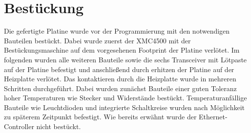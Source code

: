 \section{Bestückung}
Die gefertigte Platine wurde vor der Programmierung mit den notwendigen Bauteilen bestückt. Dabei wurde zuerst der XMC4500 mit der Bestückungsmaschine auf dem vorgesehenen Footprint der Platine verlötet. Im folgenden wurden alle weiteren Bauteile sowie die sechs Transceiver mit Lötpaste auf der Platine befestigt und anschließend durch erhitzen der Platine auf der Heizplatte verlötet. Das kontaktieren durch die Heizplatte wurde in mehreren Schritten durchgeführt. Dabei wurden zunächst Bauteile einer guten Toleranz hoher Temperaturen wie Stecker und Widerstände bestückt. Temperaturanfällige Bauteile wie Leuchtdioden und integrierte Schaltkreise wurden nach Möglichkeit zu späterem Zeitpunkt befestigt. Wie bereits erwähnt wurde der Ethernet-Controller nicht bestückt.

